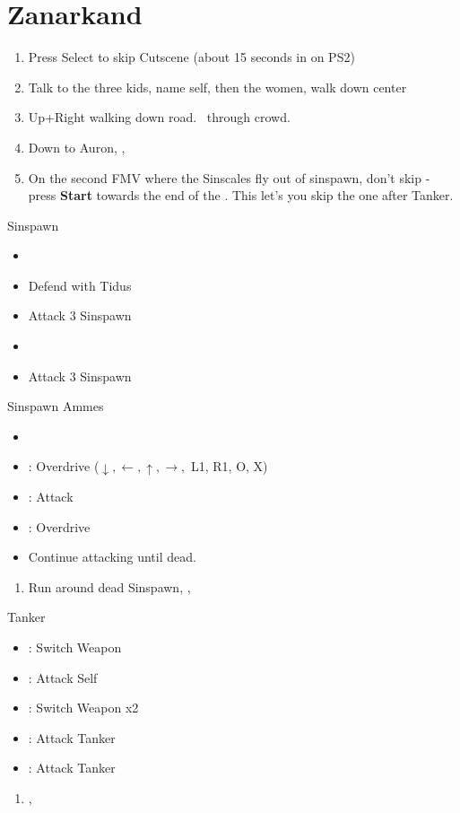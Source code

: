 \chapter{Zanarkand}\label{ch:zanarkand}

\begin{enumerate}
	\item Press Select to skip Cutscene (about 15 seconds in on PS2)
	\item Talk to the three kids, name self, then the women, walk down center
	\item Up+Right walking down road. \sd \ through crowd. \skippablefmv
	\item Down to Auron, \sd, \skippablefmv
	\item On the second FMV where the Sinscales fly out of sinspawn, don't skip - press \textbf{Start} towards the end of the \fmv. This let's you skip the one after Tanker. \sd
\end{enumerate}
\begin{battle}{Sinspawn}
	\begin{itemize}
		\item \sd
		\item Defend with Tidus
		\item Attack 3 Sinspawn
		\item \sd
		\item Attack 3 Sinspawn
	\end{itemize}
\end{battle}
\begin{battle}[2400]{Sinspawn Ammes}
	\begin{itemize}
		\item \sd
		\item \auron: Overdrive ($\downarrow, \leftarrow, \uparrow, \rightarrow,$ L1, R1, O, X)
		\item \tidus: Attack
		\item \tidus: Overdrive
		\item Continue attacking until dead.
	\end{itemize}
\end{battle}
\begin{enumerate}[resume]
	\item Run around dead Sinspawn, \save, \sd
\end{enumerate}
\begin{battle}[1000]{Tanker}
	\begin{itemize}
		\item \tidus: Switch Weapon
		\item \auron: Attack Self
		\item \tidus: Switch Weapon x2
		\item \tidus: Attack Tanker
		\item \auron: Attack Tanker
	\end{itemize}
\end{battle}
\begin{enumerate}[resume]
	\item \cs[2:00], \skippablefmv
\end{enumerate}